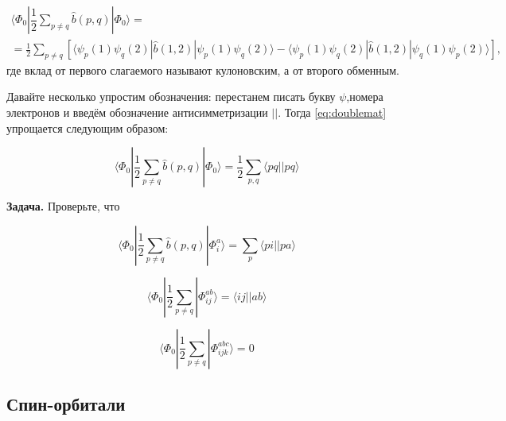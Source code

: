 \documentclass[12pt, oneside]{article}
\numberwithin{equation}{section}  %
\begin{document}
\begin{multline}
\langle \Phi_0 | \dfrac{1}{2} \sum_{p \neq q} \hat{b}(p, q) | \Phi_0 \rangle =\\=
\frac{1}{2} \sum_{p\neq q} 
\left[\langle \psi_p(1) \psi_q (2) |\hat{b} (1, 2)| \psi_p (1) \psi_q (2) \rangle  - \langle \psi_p(1) \psi_q (2) | \hat{b} (1, 2) | \psi_q (1) \psi_p (2) \rangle \right],
\label{eq:doublemat}
\end{multline}
где вклад от первого слагаемого называют кулоновским, а от второго обменным. 

Давайте несколько упростим обозначения: перестанем писать букву \(\psi\),номера электронов и введём обозначение антисимметризации \(||\). Тогда \eqref{eq:doublemat} упрощается следующим образом:

\begin{equation}
\langle \Phi_0 | \dfrac{1}{2} \sum_{p \neq q} \hat{b}(p, q) | \Phi_0 \rangle =
\dfrac{1}{2}\sum_{p, q} \langle p q || p q \rangle
\end{equation}

\textbf{Задача.} Проверьте, что 

\[\langle \Phi_0 | \dfrac{1}{2} \sum_{p \neq q} \hat{b}(p, q) | \Phi_i^a \rangle = \sum_{p} \langle p i || p a \rangle\]

\[\langle \Phi_0 | \dfrac{1}{2} \sum_{p \neq q} | \Phi_{ij} ^{a b} \rangle = \langle i j  || a b \rangle\]

\[\langle \Phi_0 | \dfrac{1}{2} \sum_{p \neq q} | \Phi_{ijk} ^{a b c} \rangle = 0\]

\subsection{Спин-орбитали}
\end{document}
